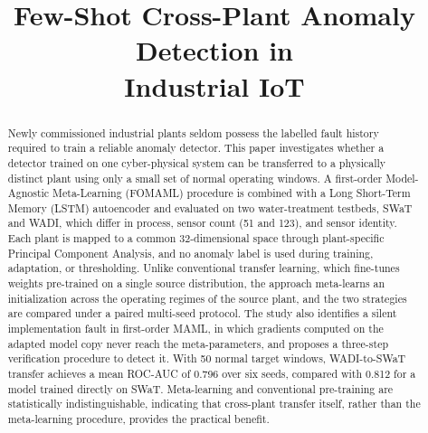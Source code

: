 \documentclass[conference]{IEEEtran}
\begin{document}
\title{Few-Shot Cross-Plant Anomaly Detection in\\ Industrial IoT}

\author{
\and
{}
}

\maketitle
\thispagestyle{empty}
\pagestyle{empty}

\begin{abstract}
Newly commissioned industrial plants seldom possess the labelled fault
history required to train a reliable anomaly detector. This paper
investigates whether a detector trained on one cyber-physical system can be
transferred to a physically distinct plant using only a small set of normal
operating windows. A first-order Model-Agnostic Meta-Learning (FOMAML)
procedure is combined with a Long Short-Term Memory (LSTM) autoencoder and
evaluated on two water-treatment testbeds, SWaT and WADI, which differ in
process, sensor count (51 and 123), and sensor identity. Each plant is mapped
to a common 32-dimensional space through plant-specific Principal Component
Analysis, and no anomaly label is used during training, adaptation, or
thresholding. Unlike conventional transfer learning, which fine-tunes weights
pre-trained on a single source distribution, the approach meta-learns an
initialization across the operating regimes of the source plant, and the two
strategies are compared under a paired multi-seed protocol. The study also
identifies a silent implementation fault in first-order MAML, in which
gradients computed on the adapted model copy never reach the
meta-parameters, and proposes a three-step verification procedure to detect
it. With 50 normal target windows, WADI-to-SWaT transfer achieves a mean
ROC-AUC of 0.796 over six seeds, compared with 0.812 for a model trained
directly on SWaT. Meta-learning and conventional pre-training are
statistically indistinguishable, indicating that cross-plant transfer itself,
rather than the meta-learning procedure, provides the practical benefit.
\end{abstract}
\end{document}
